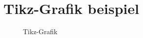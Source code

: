 \section{Tikz-Grafik beispiel}
\begin{figure}[h]
    \centering
    
    \caption{Tikz-Grafik}
    \label{fig:Tikzbeispiel}
\end{figure}